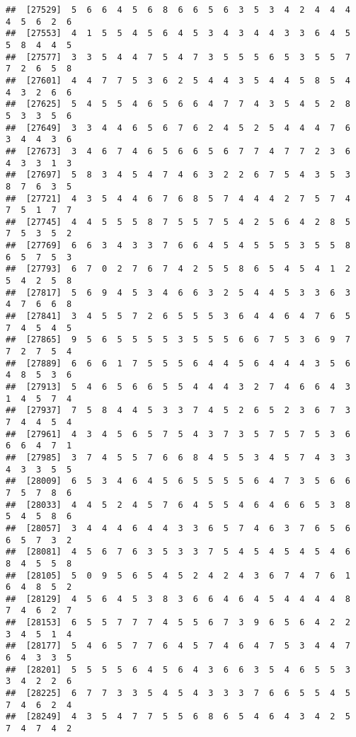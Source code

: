 \documentclass[
]{book}
\begin{document}
\begin{verbatim}
##  [27529]  5  6  6  4  5  6  8  6  6  5  6  3  5  3  4  2  4  4  4  4  5  6  2  6
##  [27553]  4  1  5  5  4  5  6  4  5  3  4  3  4  4  3  3  6  4  5  5  8  4  4  5
##  [27577]  3  3  5  4  4  7  5  4  7  3  5  5  5  6  5  3  5  5  7  7  2  6  5  8
##  [27601]  4  4  7  7  5  3  6  2  5  4  4  3  5  4  4  5  8  5  4  4  3  2  6  6
##  [27625]  5  4  5  5  4  6  5  6  6  4  7  7  4  3  5  4  5  2  8  5  3  3  5  6
##  [27649]  3  3  4  4  6  5  6  7  6  2  4  5  2  5  4  4  4  7  6  3  4  4  3  6
##  [27673]  3  4  6  7  4  6  5  6  6  5  6  7  7  4  7  7  2  3  6  4  3  3  1  3
##  [27697]  5  8  3  4  5  4  7  4  6  3  2  2  6  7  5  4  3  5  3  8  7  6  3  5
##  [27721]  4  3  5  4  4  6  7  6  8  5  7  4  4  4  2  7  5  7  4  7  5  1  7  7
##  [27745]  4  4  5  5  5  8  7  5  5  7  5  4  2  5  6  4  2  8  5  7  5  3  5  2
##  [27769]  6  6  3  4  3  3  7  6  6  4  5  4  5  5  5  3  5  5  8  6  5  7  5  3
##  [27793]  6  7  0  2  7  6  7  4  2  5  5  8  6  5  4  5  4  1  2  5  4  2  5  8
##  [27817]  5  6  9  4  5  3  4  6  6  3  2  5  4  4  5  3  3  6  3  4  7  6  6  8
##  [27841]  3  4  5  5  7  2  6  5  5  5  3  6  4  4  6  4  7  6  5  7  4  5  4  5
##  [27865]  9  5  6  5  5  5  5  3  5  5  5  6  6  7  5  3  6  9  7  7  2  7  5  4
##  [27889]  6  6  6  1  7  5  5  5  6  4  4  5  6  4  4  4  3  5  6  4  8  5  3  6
##  [27913]  5  4  6  5  6  6  5  5  4  4  4  3  2  7  4  6  6  4  3  1  4  5  7  4
##  [27937]  7  5  8  4  4  5  3  3  7  4  5  2  6  5  2  3  6  7  3  7  4  4  5  4
##  [27961]  4  3  4  5  6  5  7  5  4  3  7  3  5  7  5  7  5  3  6  6  6  4  7  1
##  [27985]  3  7  4  5  5  7  6  6  8  4  5  5  3  4  5  7  4  3  3  4  3  3  5  5
##  [28009]  6  5  3  4  6  4  5  6  5  5  5  5  6  4  7  3  5  6  6  7  5  7  8  6
##  [28033]  4  4  5  2  4  5  7  6  4  5  5  4  6  4  6  6  5  3  8  5  4  5  8  6
##  [28057]  3  4  4  4  6  4  4  3  3  6  5  7  4  6  3  7  6  5  6  6  5  7  3  2
##  [28081]  4  5  6  7  6  3  5  3  3  7  5  4  5  4  5  4  5  4  6  8  4  5  5  8
##  [28105]  5  0  9  5  6  5  4  5  2  4  2  4  3  6  7  4  7  6  1  6  4  8  5  2
##  [28129]  4  5  6  4  5  3  8  3  6  6  4  6  4  5  4  4  4  4  8  7  4  6  2  7
##  [28153]  6  5  5  7  7  7  4  5  5  6  7  3  9  6  5  6  4  2  2  3  4  5  1  4
##  [28177]  5  4  6  5  7  7  6  4  5  7  4  6  4  7  5  3  4  4  7  6  4  3  3  5
##  [28201]  5  5  5  5  6  4  5  6  4  3  6  6  3  5  4  6  5  5  3  3  4  2  2  6
##  [28225]  6  7  7  3  3  5  4  5  4  3  3  3  7  6  6  5  5  4  5  7  4  6  2  4
##  [28249]  4  3  5  4  7  7  5  5  6  8  6  5  4  6  4  3  4  2  5  7  4  7  4  2

\end{verbatim}
\end{document}
